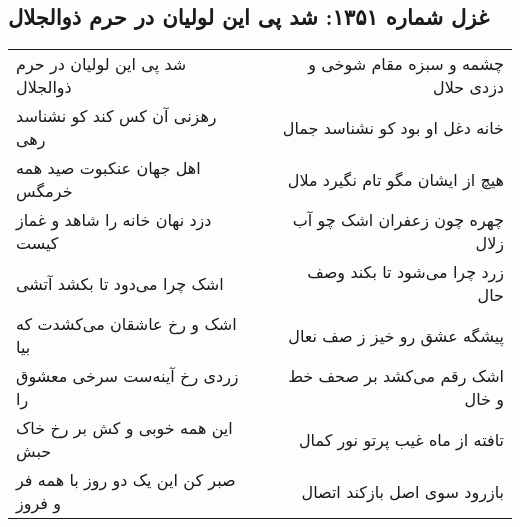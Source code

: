 \begin{center}
\section*{غزل شماره ۱۳۵۱: شد پی این لولیان در حرم ذوالجلال}
\label{sec:1351}
\begin{longtable}{l p{0.5cm} r}
شد پی این لولیان در حرم ذوالجلال
&&
چشمه و سبزه مقام شوخی و دزدی حلال
\\
رهزنی آن کس کند کو نشناسد رهی
&&
خانه دغل او بود کو نشناسد جمال
\\
اهل جهان عنکبوت صید همه خرمگس
&&
هیچ از ایشان مگو تام نگیرد ملال
\\
دزد نهان خانه را شاهد و غماز کیست
&&
چهره چون زعفران اشک چو آب زلال
\\
اشک چرا می‌دود تا بکشد آتشی
&&
زرد چرا می‌شود تا بکند وصف حال
\\
اشک و رخ عاشقان می‌کشدت که بیا
&&
پیشگه عشق رو خیز ز صف نعال
\\
زردی رخ آینه‌ست سرخی معشوق را
&&
اشک رقم می‌کشد بر صحف خط و خال
\\
این همه خوبی و کش بر رخ خاک حبش
&&
تافته از ماه غیب پرتو نور کمال
\\
صبر کن این یک دو روز با همه فر و فروز
&&
بازرود سوی اصل بازکند اتصال
\\
\end{longtable}
\end{center}
